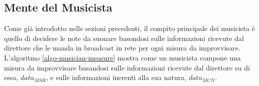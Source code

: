 \subsection{Mente del Musicista}
%   	
%
%
%   	
%

Come già introdotto nelle sezioni precedenti, il compito principale dei musicista è
quello di decidere le note da suonare basondosi sulle informazioni
ricevute dal direttore che le manda in broadcast in rete per ogni misura
da improvvisare. L'algoritmo \ref{algo-musician-measure} mostra come un
musicista compone una misura da improvvisare basandosi sulle
informazioni ricevute dal direttore su di essa, $data_{MSR}$, e sulle
informazioni inerenti alla sua natura, $data_{MCN}$. 

